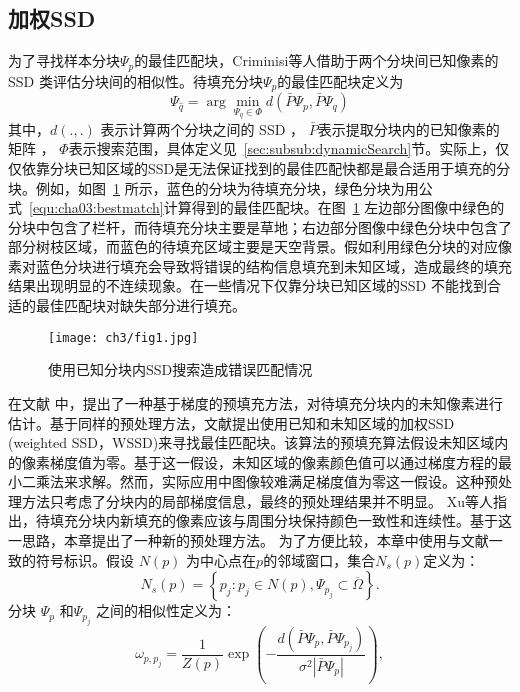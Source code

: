  \subsection{加权SSD}
 \label{sec:sub:WSSD}
 为了寻找样本分块\(\Psi_p\)的最佳匹配块，Criminisi等人\cite{Criminisi04regionfilling}借助于两个分块间已知像素的SSD 类评估分块间的相似性。待填充分块\(\Psi_p\)的最佳匹配块定义为
 \begin{equation}
 \label{equ:cha03:bestmatch}
 \Psi_{\hat{q}}= \arg \min_{\Psi_q\in\Phi}d(\bar{P}\Psi_p,\bar{P}\Psi_q)
 \end{equation}
 其中，\(d(.,.)\) 表示计算两个分块之间的 SSD ， \(\bar{P}\)表示提取分块内的已知像素的矩阵 ， \(\Phi\)表示搜索范围，具体定义见~\ref{sec:subsub:dynamicSearch}节。实际上，仅仅依靠分块已知区域的SSD是无法保证找到的最佳匹配快都是最合适用于填充的分块。例如，如图~\ref{cha03:fig:1} 所示，蓝色的分块为待填充分块，绿色分块为用公式~\ref{equ:cha03:bestmatch}计算得到的最佳匹配块。在图~\ref{cha03:fig:1} 左边部分图像中绿色的分块中包含了栏杆，而待填充分块主要是草地；右边部分图像中绿色分块中包含了部分树枝区域，而蓝色的待填充区域主要是天空背景。假如利用绿色分块的对应像素对蓝色分块进行填充会导致将错误的结构信息填充到未知区域，造成最终的填充结果出现明显的不连续现象。在一些情况下仅靠分块已知区域的SSD 不能找到合适的最佳匹配块对缺失部分进行填充。
 \begin{figure}[!htbp]
 	\begin{center}
 			\texttt{[image: ch3/fig1.jpg]}
 	\end{center}
     \caption{使用已知分块内SSD搜索造成错误匹配情况}
 	\label{cha03:fig:1}
 \end{figure}
 在文献 中，提出了一种基于梯度的预填充方法，对待填充分块内的未知像素进行估计。基于同样的预处理方法，文献提出使用已知和未知区域的加权SSD (weighted SSD，WSSD)来寻找最佳匹配块。该算法的预填充算法假设未知区域内的像素梯度值为零。基于这一假设，未知区域的像素颜色值可以通过梯度方程的最小二乘法来求解。然而，实际应用中图像较难满足梯度值为零这一假设。这种预处理方法只考虑了分块内的局部梯度信息，最终的预处理结果并不明显。 Xu等人\cite{Xu:2010}指出，待填充分块内新填充的像素应该与周围分块保持颜色一致性和连续性。基于这一思路，本章提出了一种新的预处理方法。
 为了方便比较，本章中使用与文献一致的符号标识。假设 \(N(p)\) 为中心点在\(p\)的邻域窗口，集合\(N_s(p)\)定义为：
 $$N_s(p)= \left\{ p_j:p_j \in N(p),\Psi_{p_j} \subset \overline{\Omega} \right\}.$$
 分块 \(\Psi_p\) 和\(\Psi_{p_j}\)  之间的相似性定义为：
 $$\omega_{p,p_{j}}=\frac{1}{Z(p)}\exp\left(-\frac{d(\bar{P}\Psi_p,\bar{P}\Psi_{p_j})}{\sigma^2\left|\bar{P}\Psi_p\right|}\right),$$

